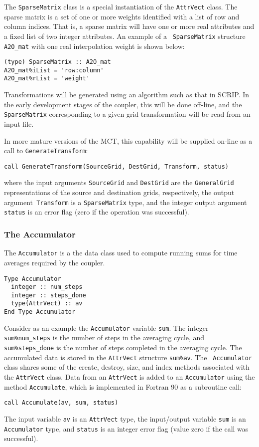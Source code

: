 \documentclass{article}
\begin{document}
The {\tt SparseMatrix} class is a special instantiation of the
{\tt AttrVect} class.  The sparse matrix is a set of one or more
weights identified with a list of row and column indices.  That
is, a sparse matrix will have one or more real attributes and a
fixed list of two integer attributes.  An example of a {\tt
SparseMatrix} structure {\tt A2O\_mat} with one real interpolation
weight is shown below:
\begin{verbatim}
(type) SparseMatrix :: A2O_mat
A2O_mat%iList = 'row:column'
A2O_mat%rList = 'weight'
\end{verbatim}

Transformations will be generated using an algorithm such as that
in SCRIP.  In the early development stages of the coupler, this
will be done off-line, and the {\tt SparseMatrix} corresponding
to a given grid transformation will be read from an input file.

In more mature versions of the MCT, this capability will be
supplied on-line as a call to {\tt GenerateTransform}:
\begin{verbatim}
call GenerateTransform(SourceGrid, DestGrid, Transform, status)
\end{verbatim}
where the input arguments {\tt SourceGrid} and {\tt DestGrid} are
the {\tt GeneralGrid} representations of the source and
destination grids, respectively, the output argument{\tt
Transform} is a {\tt SparseMatrix} type, and the integer output
argument {\tt status} is an error flag (zero if the operation was
successful).

\subsubsection{The Accumulator}

The {\tt Accumulator} is a the data class used to compute running
sums for time averages required by the coupler.

\begin{verbatim}
Type Accumulator
  integer :: num_steps
  integer :: steps_done
  type(AttrVect) :: av
End Type Accumulator
\end{verbatim}

Consider as an example the {\tt Accumulator} variable {\tt sum}.
The integer {\tt sum\%num\_steps} is the number of steps in the
averaging cycle, and {\tt sum\%steps\_done} is the number of steps
completed in the averaging cycle.  The accumulated data is stored
in the {\tt AttrVect} structure {\tt sum\%av}.  The {\tt
Accumulator} class shares some of the create, destroy, size, and
index methods associated with the {\tt AttrVect} class. Data from
an {\tt AttrVect} is added to an {\tt Accumulator} using the
method {\tt Accumulate}, which is implemented in Fortran 90 as a
subroutine call:
\begin{verbatim}
call Accumulate(av, sum, status)
\end{verbatim}
The input variable {\tt av} is an {\tt AttrVect} type, the
input/output variable {\tt sum} is an {\tt Accumulator} type, and
{\tt status} is an integer error flag (value zero if the call was
successful).
\end{document}
